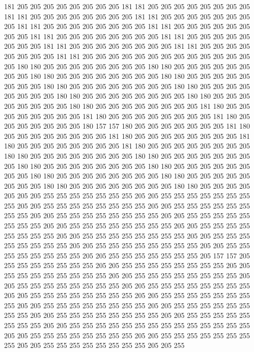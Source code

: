181 205 205 205 205 205 205 205 205 181 181 205 205 205 205 205 205 205 205 181
181 205 205 205 205 205 205 205 205 181 181 205 205 205 205 205 205 205 205 181
181 205 205 205 205 205 205 205 205 181 181 205 205 205 205 205 205 205 205 181
181 205 205 205 205 205 205 205 205 181 181 205 205 205 205 205 205 205 205 181
181 205 205 205 205 205 205 205 205 181 181 205 205 205 205 205 205 205 205 181
181 205 205 205 205 205 205 205 205 205 205 205 205 205 205 180 180 205 205 205
205 205 205 205 205 180 180 205 205 205 205 205 205 205 205 180 180 205 205 205
205 205 205 205 205 180 180 205 205 205 205 205 205 205 205 180 180 205 205 205
205 205 205 205 205 180 180 205 205 205 205 205 205 205 205 180 180 205 205 205
205 205 205 205 205 180 180 205 205 205 205 205 205 205 205 180 180 205 205 205
205 205 205 205 205 181 180 205 205 205 205 205 205 205 205 181 180 205 205 205
205 205 205 205 205 181 180 205 205 205 205 205 205 205 180 157 157 180 205 205
205 205 205 205 205 181 180 205 205 205 205 205 205 205 205 181 180 205 205 205
205 205 205 205 205 181 180 205 205 205 205 205 205 205 205 181 180 205 205 205
205 205 205 205 205 180 180 205 205 205 205 205 205 205 205 180 180 205 205 205
205 205 205 205 205 180 180 205 205 205 205 205 205 205 205 180 180 205 205 205
205 205 205 205 205 180 180 205 205 205 205 205 205 205 205 180 180 205 205 205
205 205 205 205 205 180 180 205 205 205 205 205 205 205 205 180 180 205 205 205
205 205 205 205 255 255 255 255 255 255 255 205 205 255 255 255 255 255 255 255
255 205 205 255 255 255 255 255 255 255 255 205 205 255 255 255 255 255 255 255
255 205 205 255 255 255 255 255 255 255 255 205 205 255 255 255 255 255 255 255
255 205 205 255 255 255 255 255 255 255 255 205 205 255 255 255 255 255 255 255
255 205 205 255 255 255 255 255 255 255 255 205 205 255 255 255 255 255 255 255
255 205 205 255 255 255 255 255 255 255 255 205 205 255 255 255 255 255 255 255
255 205 205 255 255 255 255 255 255 255 205 157 157 205 255 255 255 255 255 255
255 205 205 255 255 255 255 255 255 255 255 205 205 255 255 255 255 255 255 255
255 205 205 255 255 255 255 255 255 255 255 205 205 255 255 255 255 255 255 255
255 205 205 255 255 255 255 255 255 255 255 205 205 255 255 255 255 255 255 255
255 205 205 255 255 255 255 255 255 255 255 205 205 255 255 255 255 255 255 255
255 205 205 255 255 255 255 255 255 255 255 205 205 255 255 255 255 255 255 255
255 205 205 255 255 255 255 255 255 255 255 205 205 255 255 255 255 255 255 255
255 255 255 255 255 255 255 205 205 255 255 255 255 255 255 255 255 205 205 255
255 255 255 255 255 255 255 205 205 255 255 255 255 255 255 255 255 205 205 255
